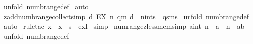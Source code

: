 \begin{isabellebody}
%
\isadelimproof
%
\endisadelimproof
%
\isatagproof
{}\isamarkupfalse%
\ {\isacharparenleft}unfold\ numb{\isacharunderscore}range{\isacharunderscore}def{\isacharparenright}\isanewline
{}\isamarkupfalse%
\ auto\isanewline
{}\isamarkupfalse%
%
\endisatagproof
{\isafoldproof}%
%
\isadelimproof
\isanewline
%
\endisadelimproof
\isanewline
{}\isamarkupfalse%
\ zadd{\isacharunderscore}numb{\isacharunderscore}range{\isacharunderscore}collect{\isacharbrackleft}simp{\isacharbrackright}{\isacharcolon}\ {\isachardoublequoteopen}{\isacharbraceleft}d{\isachardot}\ EX\ n{\isacharcolon}\ {\isacharparenleft}q{\isachardot}{\isachardot}m{\isacharparenright}{\isachardot}\ d\ {\isacharequal}\ {\isacharparenleft}{\isacharparenleft}n{\isacharcolon}{\isacharcolon}int{\isacharparenright}{\isacharplus}s{\isacharparenright}{\isacharbraceright}\ {\isacharequal}\ {\isacharparenleft}{\isacharparenleft}q{\isacharplus}s{\isacharparenright}{\isachardot}{\isachardot}{\isacharparenleft}m{\isacharplus}s{\isacharparenright}{\isacharparenright}{\isachardoublequoteclose}\isanewline
%
\isadelimproof
%
\endisadelimproof
%
\isatagproof
{}\isamarkupfalse%
\ {\isacharparenleft}unfold\ numb{\isacharunderscore}range{\isacharunderscore}def{\isacharparenright}\isanewline
{}\isamarkupfalse%
\ auto\isanewline
{}\isamarkupfalse%
\ {\isacharparenleft}rule{\isacharunderscore}tac\ x\ {\isacharequal}\ {\isachardoublequoteopen}x\ {\isacharminus}\ s{\isachardoublequoteclose}\ \ exI{\isacharparenright}\isanewline
{}\isamarkupfalse%
\ {\isacharparenleft}simp{\isacharparenright}\isanewline
{}\isamarkupfalse%
%
\endisatagproof
{\isafoldproof}%
%
\isadelimproof
\isanewline
%
\endisadelimproof
\isanewline
\isanewline
{}\isamarkupfalse%
\ num{\isacharunderscore}range{\isacharunderscore}zless{\isacharunderscore}mem{\isacharbrackleft}simp{\isacharbrackright}{\isacharcolon}\ {\isachardoublequoteopen}{\isacharbang}{\isacharbang}a{\isacharcolon}{\isacharcolon}int{\isachardot}\ n\ {\isacharless}\ a\ {\isacharequal}{\isacharequal}{\isachargreater}\ {\isacharparenleft}n\ {\isachartilde}{\isacharcolon}\ {\isacharparenleft}a{\isachardot}{\isachardot}b{\isacharparenright}{\isacharparenright}{\isachardoublequoteclose}\isanewline
%
\isadelimproof
%
\endisadelimproof
%
\isatagproof
{}\isamarkupfalse%
\ {\isacharparenleft}unfold\ numb{\isacharunderscore}range{\isacharunderscore}def{\isacharparenright}\isanewline
{}\isamarkupfalse%

\end{isabellebody}
